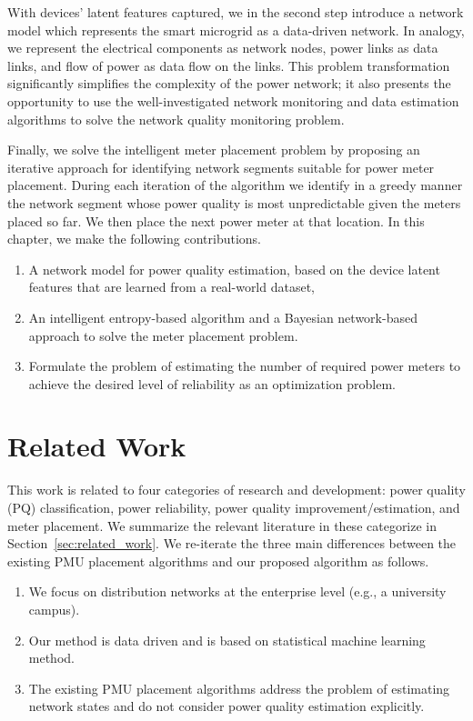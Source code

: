 With devices' latent features captured, we in the second step introduce a network model which represents the smart microgrid as a data-driven network. In analogy, we represent the electrical components as network nodes, power links as data links, and flow of power as data flow on the links. This problem transformation significantly simplifies the complexity of the power network; it also presents the opportunity to use the well-investigated network monitoring and data estimation algorithms to solve the network quality monitoring problem.

Finally, we solve the intelligent meter placement problem by proposing an iterative approach for identifying network segments suitable for power meter placement. During each iteration of the algorithm we identify in a greedy manner the network segment whose power quality is most unpredictable given the meters placed so far. We then place the next power meter at that location. In this chapter, we make the following contributions. 
\begin{enumerate}
	\item A network model for power quality estimation, based on the device latent features that are learned from a real-world dataset, 
	\item An intelligent entropy-based algorithm and a Bayesian network-based approach to solve the meter placement problem.
	\item Formulate the problem of estimating the number of required power meters to achieve the desired level of reliability as an optimization problem.
\end{enumerate}

\section{Related Work}
This work is related to four categories of research and development: power quality (PQ) classification, power reliability, power quality improvement/estimation, and meter placement. We summarize the relevant literature in these categorize in Section~\ref{sec:related_work}. We re-iterate the three main differences between the existing PMU placement algorithms and our proposed algorithm as follows.

\begin{enumerate}
\item We focus on distribution networks at the enterprise level (e.g., a university campus).
\item Our method is data driven and is based on statistical machine learning method.
\item The existing PMU placement algorithms address the problem of estimating network states and do not consider power quality estimation explicitly.
\end{enumerate}

